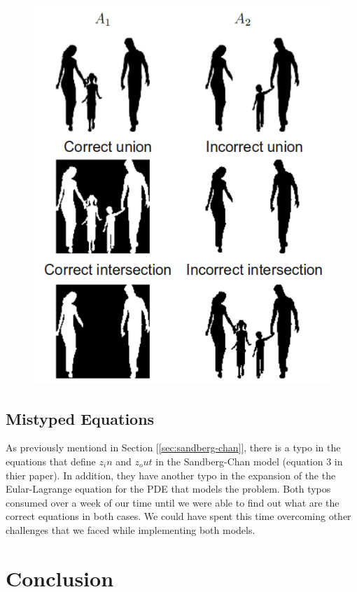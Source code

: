 \documentclass[10pt,twocolumn,letterpaper]{article}
\begin{document}
\begin{figure}[t]
\centering
\includegraphics[width=\textwidth]{phidef.png}
\caption{}
\label{fig:phidef}
\end{figure}

\subsection{Mistyped Equations}
As previously mentiond in Section [\ref{sec:sandberg-chan}], there is a typo in the equations that define $z_in$ and $z_out$ in the Sandberg-Chan model
(equation 3 in thier paper). In addition, they have another typo in the expansion of the the Eular-Lagrange equation for the PDE that models the problem. Both
typos consumed over a week of our time until we were able to find out what are the correct equations in both cases. We could have spent this time overcoming
other challenges that we faced while implementing both models.

\section{Conclusion}
\label{sec:concl}








\end{document}

